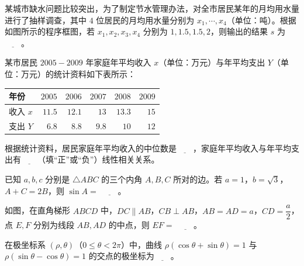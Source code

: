 \Needspace{0.4\textheight}
\begingroup
\renewenvironment{question}{\Needspace{0.5\textheight}}{}
\begin{question}
某城市缺水问题比较突出，为了制定节水管理办法，对全市居民某年的月均用水量进行了抽样调查，其中 $4$ 位居民的月均用水量分别为 $x_1,\cdots,x_4$（单位：吨）。根据如图所示的程序框图，若 $x_1,x_2,x_3,x_4$ 分别为 $1,1.5,1.5,2$，则输出的结果 $s$ 为$\underline{\qquad}$。
\nopagebreak[4]
\begin{center}\end{center}
\nopagebreak[4]
\end{question}
\endgroup
\begin{question}
某市居民 $2005-2009$ 年家庭年平均收入 $x$（单位：万元）与年平均支出 $Y$（单位：万元）的统计资料如下表所示：

\begin{center}
\begin{tabular}{lrrrrr}
\toprule
年份 & $2005$ & $2006$ & $2007$ & $2008$ & $2009$ \\
\midrule
收入 $x$ & $11.5$ & $12.1$ & $13$ & $13.3$ & $15$ \\
支出 $Y$ & $6.8$ & $8.8$ & $9.8$ & $10$ & $12$ \\
\bottomrule
\end{tabular}
\end{center}

根据统计资料，居民家庭年平均收入的中位数是$\underline{\qquad}$，家庭年平均收入与年平均支出有$\underline{\qquad}$（填“正”或“负”）线性相关关系。

\end{question}
\begin{question}
已知 $a,b,c$ 分别是 $\triangle ABC$ 的三个内角 $A,B,C$ 所对的边。若 $a=1$，$b=\sqrt3$，$A+C=2B$，则 $\sin A=$ $\underline{\qquad}$。

\Needspace{0.4\textheight}
\end{question}
\begingroup
\renewenvironment{question}{\Needspace{0.5\textheight}}{}
\begin{question}
如图，在直角梯形 $ABCD$ 中，$DC\parallel AB$，$CB\perp AB$，$AB=AD=a$，$CD=\dfrac a2$，点 $E,F$ 分别为线段 $AB,AD$ 的中点，则 $EF=$ $\underline{\qquad}$。
\nopagebreak[4]
\begin{center}\end{center}
\nopagebreak[4]
\end{question}
\endgroup
\begin{question}
在极坐标系 $(\rho,\theta)$（$0\leqslant\theta<2\pi$）中，曲线 $\rho(\cos\theta+\sin\theta)=1$ 与 $\rho(\sin\theta-\cos\theta)=1$ 的交点的极坐标为$\underline{\qquad}$。

\end{question}

